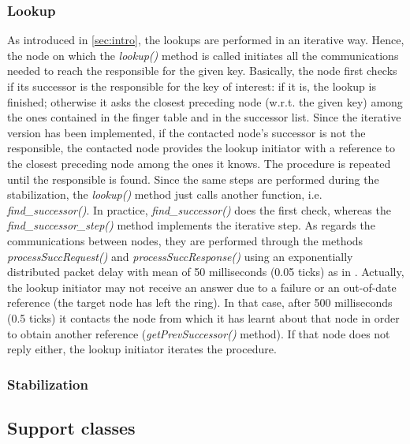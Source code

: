 \documentclass[11pt,twocolumn,letterpaper]{article}
\begin{document}
	\subsubsection{Lookup}
	\label{subsubsec:lookup}
	As introduced in \cref{sec:intro}, the lookups are performed in an iterative way. Hence, the node on which the \textit{lookup()} method is called initiates all the communications needed to reach the responsible for the given key. \newline
	Basically, the node first checks if its successor is the responsible for the key of interest: if it is, the lookup is finished; otherwise it asks the closest preceding node (w.r.t. the given key) among the ones contained in the finger table and in the successor list. Since the iterative version has been implemented, if the contacted node's successor is not the responsible, the contacted node provides the lookup initiator with a reference to the closest preceding node among the ones it knows. The procedure is repeated until the responsible is found. \newline
	Since the same steps are performed during the stabilization, the \textit{lookup()} method just calls another function, i.e. \textit{find\_successor()}. In practice, \textit{find\_successor()} does the first check, whereas the \textit{find\_successor\_step()} method implements the iterative step. As regards the communications between nodes, they are performed through the methods \textit{processSuccRequest()} and \textit{processSuccResponse()} using an exponentially distributed packet delay with mean of 50 milliseconds (0.05 ticks) as in \cite{chord}. \newline
	Actually, the lookup initiator may not receive an answer due to a failure or an out-of-date reference (the target node has left the ring). In that case, after 500 milliseconds (0.5 ticks) it contacts the node from which it has learnt about that node in order to obtain another reference (\textit{getPrevSuccessor()} method). If that node does not reply either, the lookup initiator iterates the procedure.
	
	\subsubsection{Stabilization}
	\label{subsubsec:stabilization}
	
	\subsection{Support classes}
	\label{subsec:support-classes}
	
\end{document}
